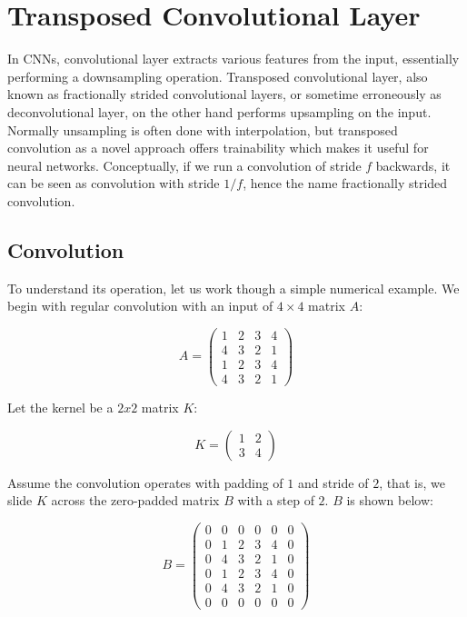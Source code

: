 \section{Transposed Convolutional Layer}

In CNNs, convolutional layer extracts various features from the input, essentially performing a downsampling
operation. Transposed convolutional layer, also known as fractionally strided convolutional layers, or sometime
erroneously as deconvolutional layer, on the other hand performs upsampling on the input. Normally unsampling
is often done with interpolation, but transposed convolution as a novel approach offers trainability which
makes it useful for neural networks. Conceptually, if we run a convolution of stride $f$ backwards,
it can be seen as convolution with stride $1/f$, hence the name fractionally strided convolution.

\subsection{Convolution}

To understand its operation, let us work though a simple numerical example. We begin with regular convolution
with an input of $4 \times 4$ matrix $A$:

$$
A =
  \begin{pmatrix}
    1 & 2 & 3 & 4 \\
    4 & 3 & 2 & 1 \\
    1 & 2 & 3 & 4 \\
    4 & 3 & 2 & 1
  \end{pmatrix}
$$

Let the kernel be a $2x2$ matrix $K$:

$$
K =
  \begin{pmatrix}
    1 & 2 \\
    3 & 4
  \end{pmatrix}
$$

Assume the convolution operates with padding of $1$ and stride of $2$, that is, we slide $K$ across the
zero-padded matrix $B$ with a step of $2$. $B$ is shown below:

$$
B =
  \begin{pmatrix}
    0 & 0 & 0 & 0 & 0 & 0 \\
    0 & 1 & 2 & 3 & 4 & 0 \\
    0 & 4 & 3 & 2 & 1 & 0 \\
    0 & 1 & 2 & 3 & 4 & 0 \\
    0 & 4 & 3 & 2 & 1 & 0 \\
    0 & 0 & 0 & 0 & 0 & 0
  \end{pmatrix}
$$


